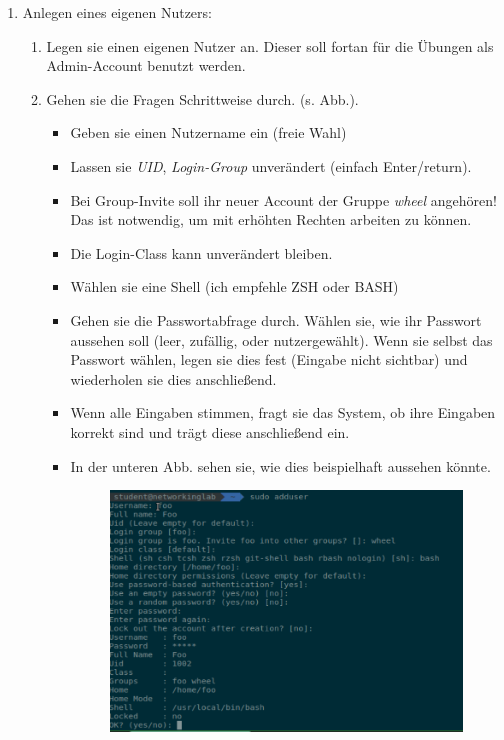 \documentclass[paper=a4,fontsize=11pt]{scrartcl}%
\numberwithin{equation}{section}
\newenvironment{solution}
	{
		\color{blue}
		\textbf{Lösung:}
	}{}
\begin{document}
\begin{enumerate}
\begin{enumerate} [label=(\alph*)]
		\begin{solution}
        \begin{lstlisting}[style=Bash, language=Bash]
# ohne -h in Bytes
df -h
		\end{lstlisting}
		\end{solution}
        \end{enumerate}
        \item Anlegen eines eigenen Nutzers:
        \begin{enumerate}
        		\item Legen sie einen eigenen Nutzer an. Dieser soll fortan für die Übungen als Admin-Account benutzt werden.
        		\item Gehen sie die Fragen Schrittweise durch. (s. Abb.).
        		\begin{itemize}
        			\item Geben sie einen Nutzername ein (freie Wahl)
        			\item Lassen sie \emph{UID}, \emph{Login-Group} unverändert (einfach Enter/return).
        			\item Bei Group-Invite soll ihr neuer Account der Gruppe \emph{wheel} angehören! Das ist notwendig, um mit erhöhten Rechten arbeiten zu können.
        			\item Die Login-Class kann unverändert bleiben.
        			\item Wählen sie eine Shell (ich empfehle ZSH oder BASH)
        			\item Gehen sie die Passwortabfrage durch. Wählen sie, wie ihr Passwort aussehen soll (leer, zufällig, oder nutzergewählt). Wenn sie selbst das Passwort wählen, legen sie dies fest (Eingabe nicht sichtbar) und wiederholen sie dies anschließend.
        			\item Wenn alle Eingaben stimmen, fragt sie das System, ob ihre Eingaben korrekt sind und trägt diese anschließend ein.
       			\item In der unteren Abb. sehen sie, wie dies beispielhaft aussehen könnte.
       			\begin{figure}[h]
       			\centering
       			\includegraphics[scale=0.4]{add_user}

\end{figure}
\end{itemize}
\end{enumerate}
\end{enumerate}
\end{document}
